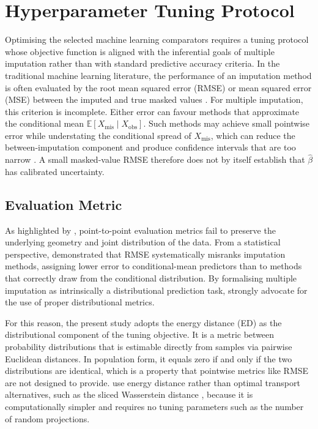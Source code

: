 \section{Hyperparameter Tuning Protocol}
\label{sec:tuning}
Optimising the selected machine learning comparators requires a tuning protocol whose objective function is aligned with the inferential goals of multiple imputation rather than with standard predictive accuracy criteria. In the traditional machine learning literature, the performance of an imputation method is often evaluated by the root mean squared error (RMSE) or mean squared error (MSE) between the imputed and true masked values \citep{stekhoven2012missforest, yoon2018gain}. For multiple imputation, this criterion is incomplete. Either error can favour methods that approximate the conditional mean $\mathbb{E}[X_{\mathrm{mis}} \mid X_{\mathrm{obs}}]$. Such methods may achieve small pointwise error while understating the conditional spread of $X_{\mathrm{mis}}$, which can reduce the between-imputation component and produce confidence intervals that are too narrow \citep{vanBuuren2018, Rubin1987}. A small masked-value RMSE therefore does not by itself establish that $\hat{\beta}$ has calibrated uncertainty.

\subsection{Evaluation Metric}
As highlighted by \citet{muzellec2020missing}, point-to-point evaluation metrics fail to preserve the underlying geometry and joint distribution of the data. From a statistical perspective, \citet{naf2023imputation} demonstrated that RMSE systematically misranks imputation methods, assigning lower error to conditional-mean predictors than to methods that correctly draw from the conditional distribution. By formalising multiple imputation as intrinsically a distributional prediction task, \citet{naf2025mar} strongly advocate for the use of proper distributional metrics.

For this reason, the present study adopts the energy distance (ED) \citep{szekely2003statistics} as the distributional component of the tuning objective. It is a metric between probability distributions that is estimable directly from samples via pairwise Euclidean distances. In population form, it equals zero if and only if the two distributions are identical, which is a property that pointwise metrics like RMSE are not designed to provide. \citet{naf2025mar} use energy distance rather than optimal transport alternatives, such as the sliced Wasserstein distance \citep{shadbahr2023}, because it is computationally simpler and requires no tuning parameters such as the number of random projections.

